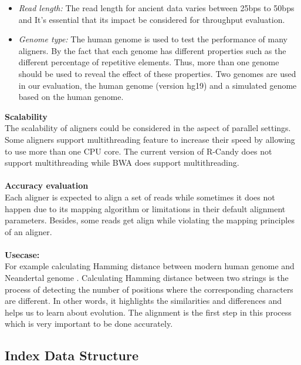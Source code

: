 \documentclass[11pt,a4paper]{report}
\begin{document}
\begin{itemize}

 \item \emph{Read length:}
The read length for ancient data varies between 25bps to 50bps and It's essential that its impact be considered for throughput evaluation.


 \item \emph{Genome type:} 
The human genome is used to test the performance of many aligners.
By the fact that each genome has different properties such as the different percentage of repetitive elements.
Thus, more than one genome should be used to reveal the effect of these properties. Two genomes are used in our evaluation, the human genome (version hg19) and a simulated genome based on the human genome.

\end{itemize}
\textbf{Scalability}
\\
The scalability of aligners could be considered in the aspect of parallel settings.
Some aligners support multithreading feature to increase their speed by allowing to use more than one CPU core.
The current version of R-Candy does not support multithreading while BWA does support multithreading.
 \\\\
\textbf{Accuracy evaluation}
\\
Each aligner is expected to align a set of reads while sometimes it does not happen due to its mapping algorithm or limitations in their default alignment parameters. Besides, some reads get align while violating the mapping principles of an aligner.
\\\\
\textbf{Usecase:}
\\
For example calculating Hamming distance between modern human genome and Neandertal genome .  
Calculating Hamming distance between two strings is the process of detecting the number of positions where the corresponding characters are different. In other words, it highlights the similarities and differences and helps us to learn about evolution. The alignment is the first step in this process which is very important to be done accurately.

\subsection{Index Data Structure} \label{Index Data Structure}
\end{document}
